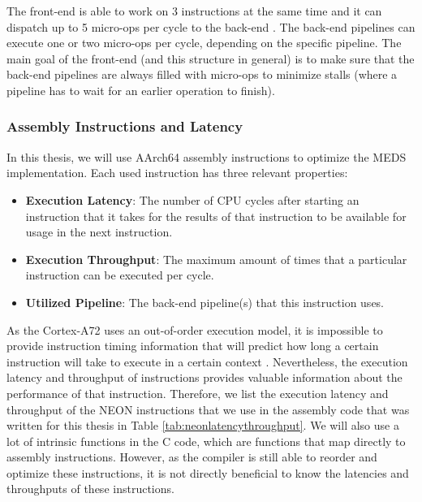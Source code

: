 \documentclass[11pt,a4paper]{report}
\theoremstyle{definition}
\begin{document}
The front-end is able to work on 3 instructions at the same time and it can dispatch up to 5 micro-ops per cycle to the back-end \cite{SandSoftwaresound2024}. The back-end pipelines can execute one or two micro-ops per cycle, depending on the specific pipeline. The main goal of the front-end (and this structure in general) is to make sure that the back-end pipelines are always filled with micro-ops to minimize stalls (where a pipeline has to wait for an earlier operation to finish).

\subsubsection{Assembly Instructions and Latency}
In this thesis, we will use AArch64 assembly instructions to optimize the MEDS implementation. Each used instruction has three relevant properties:
\begin{itemize}
  \item \textbf{Execution Latency}: The number of CPU cycles after starting an instruction that it takes for the results of that instruction to be available for usage in the next instruction.
  \item \textbf{Execution Throughput}: The maximum amount of times that a particular instruction can be executed per cycle.
  \item \textbf{Utilized Pipeline}: The back-end pipeline(s) that this instruction uses.
\end{itemize}

As the Cortex-A72 uses an out-of-order execution model, it is impossible to provide instruction timing information that will predict how long a certain instruction will take to execute in a certain context \cite{CortexA72OptGuide}. Nevertheless, the execution latency and throughput of instructions provides valuable information about the performance of that instruction. Therefore, we list the execution latency and throughput of the NEON instructions that we use in the assembly code that was written for this thesis in Table \ref{tab:neonlatencythroughput}. We will also use a lot of intrinsic functions in the C code, which are functions that map directly to assembly instructions. However, as the compiler is still able to reorder and optimize these instructions, it is not directly beneficial to know the latencies and throughputs of these instructions.
\end{document}
